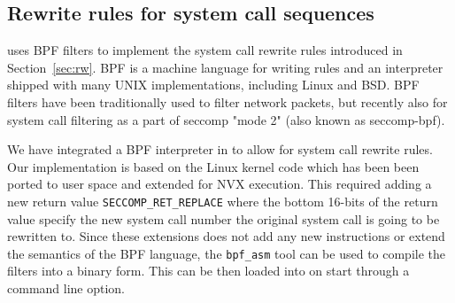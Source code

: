 


\subsection{Rewrite rules for system call sequences}
\label{sec:patternmatching}

\vx uses BPF filters to implement the system call rewrite rules introduced in
Section~\ref{sec:rw}.  BPF is a machine language for writing rules and an
interpreter shipped with many UNIX implementations, including Linux and BSD.
BPF filters have been traditionally used to filter network packets, but
recently also for system call filtering as a part of seccomp "mode 2" (also
known as seccomp-bpf).

We have integrated a BPF interpreter in \vx to allow for system call rewrite
rules. Our implementation is based on the Linux kernel code which has been been
ported to user space and extended for NVX execution.  This required adding a
new return value \lstinline`SECCOMP_RET_REPLACE` where the bottom 16-bits of
the return value specify the new system call number the original system call is
going to be rewritten to.  Since these extensions does not add any new
instructions or extend the semantics of the BPF language, the
\lstinline`bpf_asm` tool can be used to compile the filters into a binary form.
This can be then loaded into \vx on start through a command line option.

